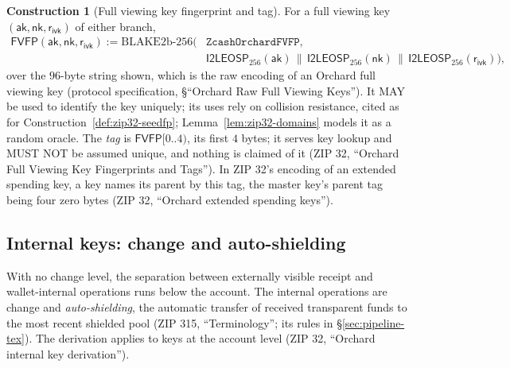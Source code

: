 \documentclass[11pt,a4paper]{article}
\theoremstyle{definition}
\newtheorem{construction}[theorem]{Construction}
\newcommand{\aksym}{\ensuremath{\mathsf{ak}}}
\newcommand{\nksym}{\ensuremath{\mathsf{nk}}}
\newcommand{\rivk}{\ensuremath{\mathsf{r_{ivk}}}}
\begin{document}
\begin{construction}[Full viewing key fingerprint and tag]%
\label{def:zip32-fvfp}
For a full viewing key $(\aksym, \nksym, \rivk)$ of either branch,
\begin{align*}
  \mathsf{FVFP}(\aksym, \nksym, \rivk) := \mathrm{BLAKE2b\text{-}256}\bigl(
    &\texttt{ZcashOrchardFVFP}, \\
    &\mathsf{I2LEOSP}_{256}(\aksym) \,\|\, \mathsf{I2LEOSP}_{256}(\nksym)
    \,\|\, \mathsf{I2LEOSP}_{256}(\rivk)\bigr),
\end{align*}
over the $96$-byte string shown, which is the raw encoding of an Orchard
full viewing key (protocol specification, \S``Orchard Raw Full Viewing
Keys''). It MAY be used to identify the key uniquely; its uses rely on collision
resistance, cited as for Construction~\ref{def:zip32-seedfp};
Lemma~\ref{lem:zip32-domains} models it as a random oracle. The \emph{tag} is
$\mathsf{FVFP}[0..4)$, its first $4$ bytes; it serves key lookup and MUST NOT be
assumed unique, and nothing is claimed of it (ZIP 32, ``Orchard Full Viewing Key
Fingerprints and Tags''). In ZIP 32's encoding of an extended spending key, a
key names its parent by this tag, the master key's parent tag being four zero
bytes (ZIP 32, ``Orchard extended spending keys'').
\end{construction}

\subsection{Internal keys: change and auto-shielding}%
\label{sec:zip32-internal}

With no change level, the separation between externally visible receipt and
wallet-internal operations runs below the account. The internal operations
are change and \emph{auto-shielding}, the automatic transfer of received
transparent funds to the most recent shielded pool (ZIP 315,
``Terminology''; its rules in \S\ref{sec:pipeline-tex}). The derivation
applies to keys at the account level (ZIP 32, ``Orchard internal key
derivation'').
\end{document}
